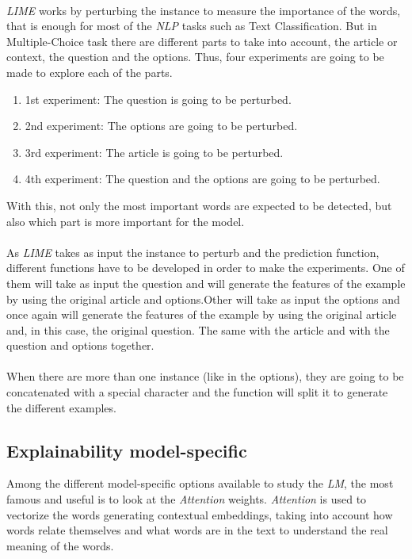 \paragraph{}
\emph{LIME} works by perturbing the instance to measure the importance of the words, that is enough for most of the \emph{NLP} tasks such as Text Classification. But in Multiple-Choice task there are different parts to take into account, the article or context, the question and the options. Thus, four experiments are going to be made to explore each of the parts.
\begin{enumerate}
	\item 1st experiment: The question is going to be perturbed.
	\item 2nd experiment: The options are going to be perturbed.
	\item 3rd experiment: The article is going to be perturbed.
	\item 4th experiment: The question and the options are going to be perturbed.
\end{enumerate}
With this, not only the most important words are expected to be detected, but also which part is more important for the model.
\paragraph{}
As \emph{LIME} takes as input the instance to perturb and the prediction function, different functions have to be developed in order to make the experiments. One of them will take as input the question and will generate the features of the example by using the original article and options.Other will take as input the options and once again will generate the features of the example by using the original article and, in this case, the original question. The same with the article and with the question and options together. 
\paragraph{}
When there are more than one instance (like in the options), they are going to be concatenated with a special character and the function will split it to generate the different examples.

\subsection{Explainability model-specific}
\label{sec:ModelSpecific} 
\noindent Among the different model-specific options available to study the \emph{LM}, the most famous and useful is to look at the \emph{Attention} weights. \emph{Attention} is used to vectorize the words generating contextual embeddings, taking into account how words relate themselves and what words are in the text to understand the real meaning of the words.
